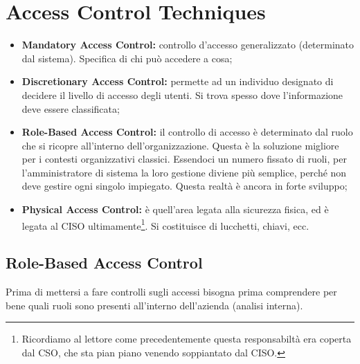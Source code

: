 \chapter{Access Control Techniques}
\label{AccessControlTechniques}
\begin{itemize}
 \item \textbf{Mandatory Access Control:} controllo d'accesso generalizzato
 (determinato dal sistema). Specifica di chi può accedere a cosa;
 \item \textbf{Discretionary Access Control:} permette ad un individuo
 designato di decidere il livello di accesso degli utenti.
 Si trova spesso dove l'informazione deve essere classificata;
 \item \textbf{Role-Based Access Control:} il controllo di accesso è
 determinato dal ruolo che si ricopre all'interno dell'organizzazione.
 Questa è la soluzione migliore per i contesti
 organizzativi classici. Essendoci un numero fissato di ruoli, per
 l'amministratore di sistema la loro gestione diviene più semplice,
 perché non deve gestire ogni singolo impiegato.
 Questa realtà è ancora in forte sviluppo;
 \item \textbf{Physical Access Control:} è quell’area legata alla sicurezza
 fisica, ed è legata al CISO ultimamente\footnote{Ricordiamo al lettore
 come precedentemente questa responsabiltà era coperta dal CSO, che sta
 pian piano venendo soppiantato dal CISO.}. Si costituisce di lucchetti,
 chiavi, ecc.

\end{itemize}


\section{Role-Based Access Control}

Prima di mettersi a fare controlli sugli accessi bisogna prima comprendere per
bene quali ruoli sono presenti all'interno dell'azienda (analisi interna).

\begin{table}[H]
\centering
{}
\caption{Un esempio di un \textit{Role-Based Access Control}}
\end{table}



